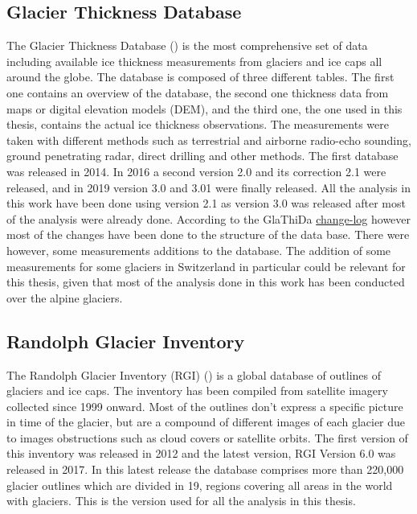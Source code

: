 \subsection{Glacier Thickness Database}
The Glacier Thickness Database (\citet{GlaThiDa2014}) is the most comprehensive set of data including available ice thickness measurements from glaciers and ice caps all around the globe. The database is composed of three different tables. The first one contains an overview of the database, the second one thickness data from maps or digital elevation models (DEM), and the third one, the one used in this thesis, contains the actual ice thickness observations. The measurements were taken with different methods such as terrestrial and airborne radio-echo sounding, ground penetrating radar, direct drilling and other methods. The first database was released in 2014. In 2016 a second version 2.0 and its correction 2.1 were released, and in 2019 version 3.0 and 3.01 were finally released. All the analysis in this work have been done using version 2.1 as version 3.0 was released after most of the analysis were already done. According to the GlaThiDa \href{https://github.com/ezwelty/glathida/blob/master/CHANGELOG.md}{change-log} however most of the changes have been done to the structure of the data base. There were however, some measurements additions to the database. The addition of some measurements for some glaciers in Switzerland in particular could be relevant for this thesis, given that most of the analysis done in this work has been conducted over the alpine glaciers. 

\subsection{Randolph Glacier Inventory}
The Randolph Glacier Inventory (RGI) (\citet{RGI2014}) is a global database of outlines of glaciers and ice caps. The inventory has been compiled from satellite imagery collected since 1999 onward. Most of the outlines don't express a specific picture in time of the glacier, but are a compound of different images of each glacier due to images obstructions such as cloud covers or satellite orbits. The first version of this inventory was released in 2012 and the latest version, RGI Version 6.0 was released in 2017. In this latest release the database comprises more than 220,000 glacier outlines which are divided in 19, regions covering all areas in the world with glaciers. This is the version used for all the analysis in this thesis. 


